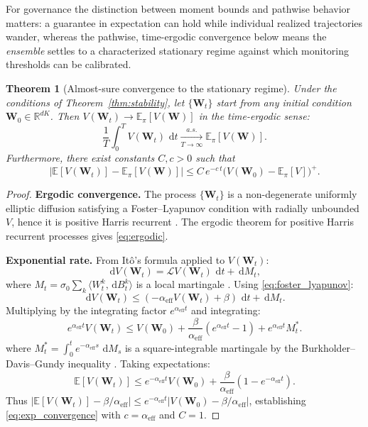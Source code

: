 \documentclass[12pt]{article}
\theoremstyle{plain}
\newtheorem{theorem}{Theorem}[section]
\theoremstyle{definition}
\newcommand{\R}{\mathbb{R}}
\newcommand{\E}{\mathbb{E}}
\newcommand{\Lgen}{\mathcal{L}}
\newcommand{\W}{\mathbf{W}}
\newcommand{\abs}[1]{\left| #1 \right|}
\newcommand{\ip}[2]{\langle #1, #2 \rangle}
\newcommand{\dif}{\,\mathrm{d}}
\begin{document}
For governance the distinction between moment bounds and pathwise behavior matters: a guarantee in expectation can hold while individual realized trajectories wander, whereas the pathwise, time-ergodic convergence below means the \emph{ensemble} settles to a characterized stationary regime against which monitoring thresholds can be calibrated.

\begin{theorem}[Almost-sure convergence to the stationary regime]
  \label{thm:as_convergence}
  Under the conditions of Theorem~\ref{thm:stability}, let
  $\{\W_t\}$ start from any initial condition $\W_0 \in \R^{dK}$.
  Then $V(\W_t) \to \E_\pi[V(\W)]$ in the time-ergodic sense:
  \begin{equation}
    \frac{1}{T}\int_0^T V(\W_t)\,\dif t
    \xrightarrow[T\to\infty]{a.s.}
    \E_\pi[V(\W)].
    \label{eq:ergodic}
  \end{equation}
  Furthermore, there exist constants $C, c > 0$ such that
  \begin{equation}
    \abs{\E[V(\W_t)] - \E_\pi[V(\W)]}
    \leq C \, e^{-c\, t} \bigl(V(\W_0) - \E_\pi[V]\bigr)^+.
    \label{eq:exp_convergence}
  \end{equation}
\end{theorem}

\begin{proof}
  \textbf{Ergodic convergence.}
  The process $\{\W_t\}$ is a non-degenerate uniformly elliptic
  diffusion satisfying a Foster--Lyapunov condition with radially
  unbounded $V$, hence it is positive Harris recurrent
  \cite{meyn1993stability}.  The ergodic theorem for positive Harris
  recurrent processes \cite{revuz1999continuous} gives \eqref{eq:ergodic}.

  \textbf{Exponential rate.}
  From It\^{o}'s formula applied to $V(\W_t)$:
  \[
    \dif V(\W_t) = \Lgen V(\W_t)\,\dif t + \dif M_t,
  \]
  where $M_t = \sigma_0 \sum_k \ip{W^k_t}{\dif B^k_t}$ is a local
  martingale \cite{rogers2000diffusions}.  Using \eqref{eq:foster_lyapunov}:
  \[
    \dif V(\W_t) \leq (-\alpha_{\mathrm{eff}} V(\W_t) + \beta)\,\dif t
    + \dif M_t.
  \]
  Multiplying by the integrating factor $e^{\alpha_{\mathrm{eff}} t}$ and
  integrating:
  \[
    e^{\alpha_{\mathrm{eff}} t} V(\W_t) \leq V(\W_0)
    + \frac{\beta}{\alpha_{\mathrm{eff}}}(e^{\alpha_{\mathrm{eff}} t} - 1)
    + e^{\alpha_{\mathrm{eff}} t} M_t^*.
  \]
  where $M_t^* = \int_0^t e^{-\alpha_{\mathrm{eff}} s}\,\dif M_s$ is a
  square-integrable martingale by the Burkholder--Davis--Gundy inequality
  \cite{revuz1999continuous}.  Taking expectations:
  \[
    \E[V(\W_t)] \leq e^{-\alpha_{\mathrm{eff}} t} V(\W_0)
    + \frac{\beta}{\alpha_{\mathrm{eff}}}(1 - e^{-\alpha_{\mathrm{eff}} t}).
  \]
  Thus $\abs{\E[V(\W_t)] - \beta/\alpha_{\mathrm{eff}}} \leq
  e^{-\alpha_{\mathrm{eff}} t} |V(\W_0) - \beta/\alpha_{\mathrm{eff}}|$,
  establishing \eqref{eq:exp_convergence} with $c = \alpha_{\mathrm{eff}}$
  and $C = 1$.
\end{proof}
\end{document}
